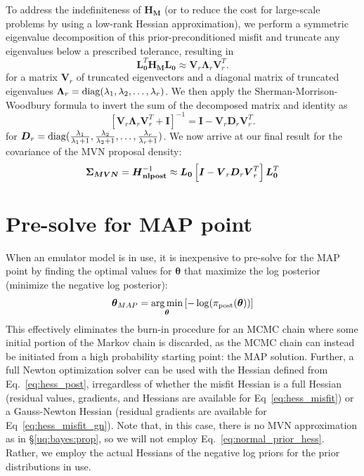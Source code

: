 To address the indefiniteness of $\boldsymbol{H_M}$ (or to reduce the
cost for large-scale problems by using a low-rank Hessian approximation), 
we perform a symmetric eigenvalue decomposition of this prior-preconditioned
misfit and truncate any eigenvalues below a prescribed tolerance, resulting in
\begin{equation}
\boldsymbol{L}_{\boldsymbol{0}}^T \boldsymbol{H_M} \boldsymbol{L}_{\boldsymbol{0}} 
\approx \boldsymbol{V}_r \boldsymbol{\Lambda}_r \boldsymbol{V}_r^T.
\end{equation}
for a matrix $\boldsymbol{V}_r$ of truncated eigenvectors and a diagonal 
matrix of truncated eigenvalues 
$\boldsymbol{\Lambda}_r = {\rm diag}(\lambda_1, \lambda_2, \dots, \lambda_r)$.
We then apply the Sherman-Morrison-Woodbury formula to invert the sum of
the decomposed matrix and identity as
\begin{equation}
\left[\boldsymbol{V}_r \boldsymbol{\Lambda}_r \boldsymbol{V}_r^T +
  \boldsymbol{I} \right]^{-1} = \boldsymbol{I} - 
  \boldsymbol{V}_r \boldsymbol{D}_r \boldsymbol{V}_r^T.
\end{equation}
for $\boldsymbol{D}_r = {\rm diag}(\frac{\lambda_1}{\lambda_1+1}, \frac{\lambda_2}{\lambda_2+1}, \dots, \frac{\lambda_r}{\lambda_r+1})$.  We now arrive
at our final result for the covariance of the MVN proposal density:
\begin{equation}
\boldsymbol{\Sigma_{MVN}} = \boldsymbol{H}_{\boldsymbol{\rm nlpost}}^{-1} \approx
  \boldsymbol{L}_{\boldsymbol{0}} \left[ \boldsymbol{I} - 
  \boldsymbol{V}_r \boldsymbol{D}_r \boldsymbol{V}_r^T \right] 
  \boldsymbol{L}_{\boldsymbol{0}}^T
\label{eq:inv_hess_nlpost_approx}
\end{equation}


\section{Pre-solve for MAP point} \label{uq:bayes:map}

When an emulator model is in use, it is inexpensive to pre-solve for
the MAP point by finding the optimal values for $\boldsymbol{\theta}$
that maximize the log posterior (minimize the negative log posterior):
\begin{equation}
\boldsymbol{\theta}_{MAP} = \operatorname*{arg\,min}_{\boldsymbol{\theta}} 
\left[ -\log(\pi_{\rm post}(\boldsymbol{\theta})) \right]
\label{eq:map_soln}
\end{equation}
This effectively eliminates the burn-in procedure for an MCMC chain
where some initial portion of the Markov chain is discarded, as the
MCMC chain can instead be initiated from a high probability starting
point: the MAP solution.  Further, a full Newton optimization solver
can be used with the Hessian defined from Eq.~\ref{eq:hess_post},
irregardless of whether the misfit Hessian is a full Hessian (residual
values, gradients, and Hessians are available for
Eq~\ref{eq:hess_misfit}) or a Gauss-Newton Hessian (residual gradients
are available for Eq~\ref{eq:hess_misfit_gn}).  Note that, in this
case, there is no MVN approximation as in \S\ref{uq:bayes:prop}, so we
will not employ Eq.~\ref{eq:normal_prior_hess}.  Rather, we employ the
actual Hessians of the negative log priors for the prior distributions
in use.


